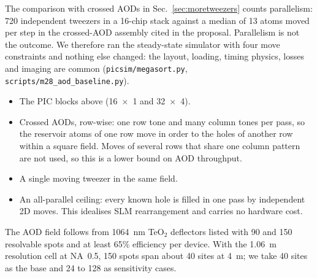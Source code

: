The comparison with crossed AODs in Sec.~\ref{sec:moretweezers} counts parallelism: 720 independent tweezers in a 16-chip stack against a median of 13 atoms moved per step in the crossed-AOD assembly cited in the proposal. Parallelism is not the outcome. We therefore ran the steady-state simulator with four move constraints and nothing else changed: the layout, loading, timing physics, losses and imaging are common (\texttt{picsim/\allowbreak megasort.py}, \texttt{scripts/\allowbreak m28\_aod\_baseline.py}).
\begin{itemize}
\item The PIC blocks above (16~$\times$~1 and 32~$\times$~4).
\item Crossed AODs, row-wise: one row tone and many column tones per pass, so the reservoir atoms of one row move in order to the holes of another row within a square field. Moves of several rows that share one column pattern are not used, so this is a lower bound on AOD throughput.
\item A single moving tweezer in the same field.
\item An all-parallel ceiling: every known hole is filled in one pass by independent 2D moves. This idealises SLM rearrangement and carries no hardware cost.
\end{itemize}
The AOD field follows from 1064~nm TeO$_2$ deflectors listed with 90 and 150 resolvable spots and at least 65\% efficiency per device. With the 1.06~\textmu m resolution cell at NA~0.5, 150 spots span about 40 sites at 4~\textmu m; we take 40 sites as the base and 24 to 128 as sensitivity cases.

